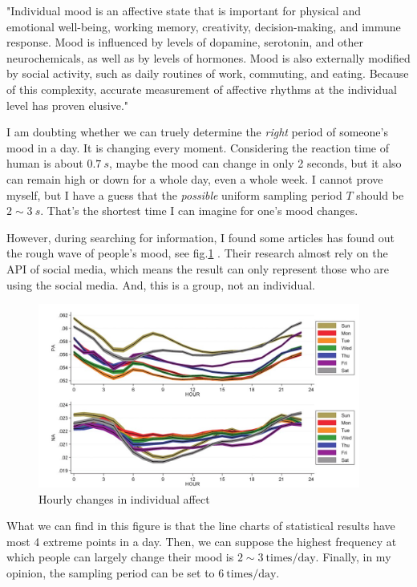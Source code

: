 \documentclass{article}
\begin{document}
"Individual mood is an affective state that is important for physical and emotional well-being, working memory, creativity, decision-making, and immune response. Mood is influenced by levels of dopamine, serotonin, and other neurochemicals, as well as by levels of hormones. Mood is also externally modified by social activity, such as daily routines of work, commuting, and eating. Because of this complexity, accurate measurement of affective rhythms at the individual level has proven elusive." \cite{mood_sci}

I am doubting whether we can truely determine the \emph{right} period of someone's mood in a day. It is changing every moment. Considering the reaction time of human is about $0.7~s$, maybe the mood can change in only 2 seconds, but it also can remain high or down for a whole day, even a whole week. I cannot prove myself, but I have a guess that the \emph{possible} uniform sampling period $T$ should be $2 \sim 3~s$. That's the shortest time I can imagine for one's mood changes.

However, during searching for information, I found some articles has found out the rough wave of people's mood, see fig.\ref{fig1} \cite{mood_sci}. Their research almost rely on the API of social media, which means the result can only represent those who are using the social media. And, this is a group, not an individual.

\begin{figure}[htbp]
    \centering
    \includegraphics[keepaspectratio,width=300pt]{mood_in_a_day.jpg}
    \caption{Hourly changes in individual affect}\label{fig1}
\end{figure}

What we can find in this figure is that the line charts of statistical results have most 4 extreme points in a day. Then, we can suppose the highest frequency at which people can largely change their mood is $2\sim 3 ~ \mathrm{times/day}$. Finally, in my opinion, the sampling period can be set to $6~\mathrm{times/day}$.
\end{document}
